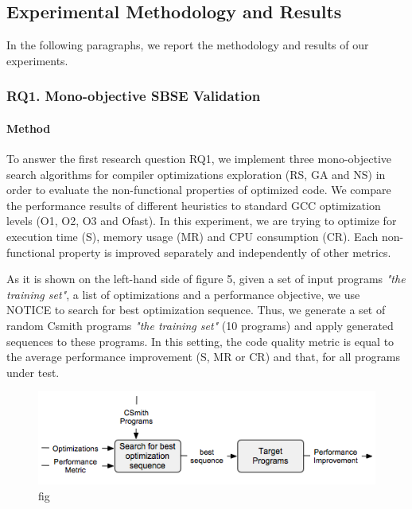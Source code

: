 \subsection{Experimental Methodology and Results}
In the following paragraphs, we report the methodology and results of our experiments.

\subsubsection{RQ1. Mono-objective SBSE Validation}
\paragraph{Method}
To answer the first research question RQ1, we implement three mono-objective search algorithms for compiler optimizations exploration (RS, GA and NS) in order to evaluate the non-functional properties of optimized code. We compare the performance results of different heuristics to standard GCC optimization levels (O1, O2, O3 and Ofast). 
In this experiment, we are trying to optimize for execution time (S), memory usage (MR) and CPU consumption (CR). Each non-functional property is improved separately and independently of other metrics. 

As it is shown on the left-hand side of figure 5, given a set of input programs \textit{"the training set"}, a list of optimizations and a performance objective, we use NOTICE to search for best optimization sequence. Thus, we generate a set of random Csmith programs \textit{"the training set"} (10 programs) and apply generated sequences to these programs. In this setting, the code quality metric is equal to the average performance improvement (S, MR or CR) and that, for all programs under test.







\begin{figure}[h]
	\centering
	\includegraphics[width=1.\linewidth]{Ressources/sensitivity.png}
	\caption{fig}
\end{figure}


